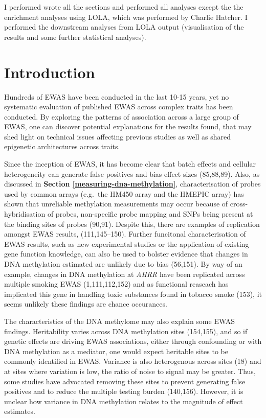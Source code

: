 \documentclass[11pt,oneside]{bristolthesis}
\begin{document}
I performed wrote all the sections and performed all analyses except the the enrichment analyses using LOLA, which was performed by Charlie Hatcher. I performed the downstream analyses from LOLA output (visualisation of the results and some further statistical analyses).

\hypertarget{introduction-04}{%
\section{Introduction}\label{introduction-04}}

Hundreds of EWAS have been conducted in the last 10-15 years, yet no systematic evaluation of published EWAS across complex traits has been conducted. By exploring the patterns of association across a large group of EWAS, one can discover potential explanations for the results found, that may shed light on technical issues affecting previous studies as well as shared epigenetic architectures across traits.

Since the inception of EWAS, it has become clear that batch effects and cellular heterogeneity can generate false positives and bias effect sizes (85,88,89). Also, as discussed in \textbf{Section \ref{measuring-dna-methylation}}, characterisation of probes used by common arrays (e.g.~the HM450 array and the HMEPIC array) has shown that unreliable methylation measurements may occur because of cross-hybridisation of probes, non-specific probe mapping and SNPs being present at the binding sites of probes (90,91). Despite this, there are examples of replication amongst EWAS results, (111,145--150). Further funcitonal characterisation of EWAS results, such as new experimental studies or the application of existing gene function knowledge, can also be used to bolster evidence that changes in DNA methylation estimated are unlikely due to bias (56,151). By way of an example, changes in DNA methylation at \emph{AHRR} have been replicated across multiple smoking EWAS (1,111,112,152) and as functional reaseach has implicated this gene in handling toxic substances found in tobacco smoke (153), it seems unlikely these findings are chance occurances.

The characteristics of the DNA methylome may also explain some EWAS findings. Heritability varies across DNA methylation sites (154,155), and so if genetic effects are driving EWAS associations, either through confounding or with DNA methylation as a mediator, one would expect heritable sites to be commonly identified in EWAS. Variance is also heterogenous across sites (18) and at sites where variation is low, the ratio of noise to signal may be greater. Thus, some studies have advocated removing these sites to prevent generating false positives and to reduce the multiple testing burden (140,156). However, it is unclear how variance in DNA methylation relates to the magnitude of effect estimates.
\end{document}
